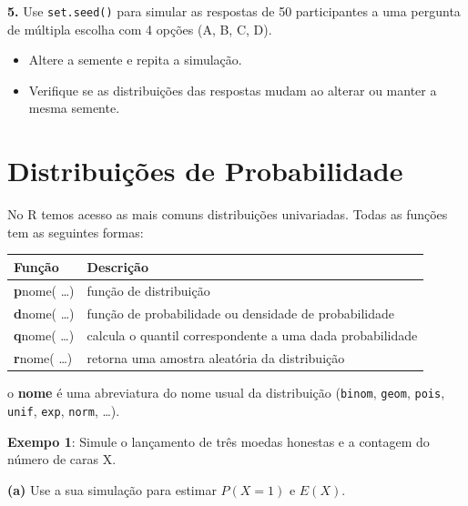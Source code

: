 \documentclass[
]{book}
\providecommand{\tightlist}{%
  \setlength{\itemsep}{0pt}\setlength{\parskip}{0pt}}
\begin{document}
\textbf{5.} Use \texttt{set.seed()} para simular as respostas de 50 participantes a uma pergunta de múltipla escolha com 4 opções (A, B, C, D).

\begin{itemize}
\tightlist
\item
  Altere a semente e repita a simulação.
\item
  Verifique se as distribuições das respostas mudam ao alterar ou manter a mesma semente.
\end{itemize}

\chapter{Distribuições de Probabilidade}\label{distribuiuxe7uxf5es-de-probabilidade}

No R temos acesso as mais comuns distribuições univariadas. Todas as
funções tem as seguintes formas:

\begin{longtable}[]{@{}
  >{\raggedright\arraybackslash}p{}
  >{\raggedright\arraybackslash}p{}@{}}
\toprule\noalign{}
\begin{minipage}[b]{\linewidth}\raggedright
\textbf{Função}
\end{minipage} & \begin{minipage}[b]{\linewidth}\raggedright
\textbf{Descrição}
\end{minipage} \\
\midrule\noalign{}
\endhead
\bottomrule\noalign{}
\endlastfoot
\textbf{p}nome( \ldots) & função de distribuição \\
\textbf{d}nome( \ldots) & função de probabilidade ou densidade de probabilidade \\
\textbf{q}nome( \ldots) & calcula o quantil correspondente a uma dada probabilidade \\
\textbf{r}nome( \ldots) & retorna uma amostra aleatória da distribuição \\
\end{longtable}

o \textbf{nome} é uma abreviatura do nome usual da distribuição (\texttt{binom},
\texttt{geom}, \texttt{pois}, \texttt{unif}, \texttt{exp}, \texttt{norm}, \ldots).

\textbf{Exempo 1}: Simule o lançamento de três moedas honestas e a contagem
do número de caras X.

\textbf{(a)} Use a sua simulação para estimar \(P(X=1)\) e \(E(X)\).
\end{document}
